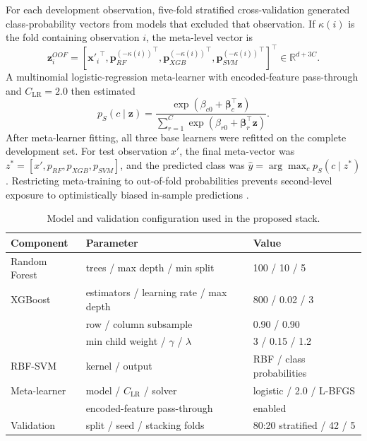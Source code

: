 \documentclass{elektr}
\begin{document}
For each development observation, five-fold stratified cross-validation generated class-probability vectors from models that excluded that observation. If $\kappa(i)$ is the fold containing observation $i$, the meta-level vector is
\begin{equation}
\mathbf{z}^{OOF}_i=\left[{\mathbf{x}'_i}^{\!\top},
{\mathbf{p}_{RF}^{(-\kappa(i))}}^{\!\top},
{\mathbf{p}_{XGB}^{(-\kappa(i))}}^{\!\top},
{\mathbf{p}_{SVM}^{(-\kappa(i))}}^{\!\top}\right]^{\!\top}\in\mathbb{R}^{d+3C}.
\label{eq:oofvector}
\end{equation}
A multinomial logistic-regression meta-learner with encoded-feature pass-through and $C_{\mathrm{LR}}=2.0$ then estimated
\begin{equation}
p_{S}(c\mid\mathbf{z})=
\frac{\exp(\beta_{c0}+\boldsymbol{\beta}_c^{\top}\mathbf{z})}
{\sum_{r=1}^{C}\exp(\beta_{r0}+\boldsymbol{\beta}_r^{\top}\mathbf{z})}.
\label{eq:meta}
\end{equation}
After meta-learner fitting, all three base learners were refitted on the complete development set. For test observation $x'$, the final meta-vector was $z^*=[x',p_{RF},p_{XGB},p_{SVM}]$, and the predicted class was $\hat y=\arg\max_c p_S(c\mid z^*)$. Restricting meta-training to out-of-fold probabilities prevents second-level exposure to optimistically biased in-sample predictions \cite{kapoor2023,alabi2023}.

\begin{table}[H]
\centering
\caption{Model and validation configuration used in the proposed stack.}
\label{tab:hyper}
\scriptsize
\begin{tabular}{lll}
\toprule
Component & Parameter & Value \\
\midrule
Random Forest & trees / max depth / min split & 100 / 10 / 5 \\
XGBoost & estimators / learning rate / max depth & 800 / 0.02 / 3 \\
 & row / column subsample & 0.90 / 0.90 \\
 & min child weight / $\gamma$ / $\lambda$ & 3 / 0.15 / 1.2 \\
RBF-SVM & kernel / output & RBF / class probabilities \\
Meta-learner & model / $C_{\mathrm{LR}}$ / solver & logistic / 2.0 / L-BFGS \\
 & encoded-feature pass-through & enabled \\
Validation & split / seed / stacking folds & 80:20 stratified / 42 / 5 \\
\bottomrule
\end{tabular}
\end{table}
\end{document}
